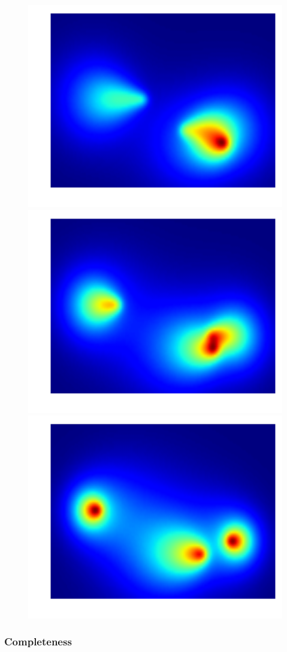 \begin{figure}[h!]
    \includegraphics[width=0.32\linewidth]{figs/ex_agent_6}
    \includegraphics[width=0.32\linewidth]{figs/ex_agent_7}
    \includegraphics[width=0.32\linewidth]{figs/ex_agent_8}
    \caption{}
    \label{fig:ex_agents}
\end{figure}



\subsubsection{Completeness}

